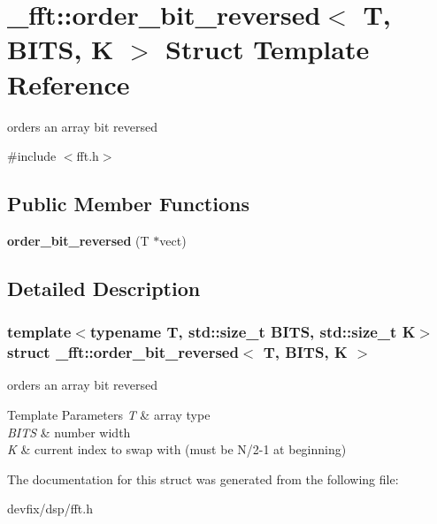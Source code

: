 \hypertarget{struct__fft_1_1order__bit__reversed}{}\section{\+\_\+fft\+:\+:order\+\_\+bit\+\_\+reversed$<$ T, B\+I\+TS, K $>$ Struct Template Reference}
\label{struct__fft_1_1order__bit__reversed}


orders an array bit reversed  




{\ttfamily \#include $<$fft.\+h$>$}

\subsection*{Public Member Functions}
\begin{DoxyCompactItemize}
\item 
\mbox{\label{struct__fft_1_1order__bit__reversed_aa31dcc8bd387dda7fa2f5b4a18b60730}} 
{\bfseries order\+\_\+bit\+\_\+reversed} (T $\ast$vect)
\end{DoxyCompactItemize}


\subsection{Detailed Description}
\subsubsection*{template$<$typename T, std\+::size\+\_\+t B\+I\+TS, std\+::size\+\_\+t K$>$\newline
struct \+\_\+fft\+::order\+\_\+bit\+\_\+reversed$<$ T, B\+I\+T\+S, K $>$}

orders an array bit reversed 


\begin{DoxyTemplParams}{Template Parameters}
{\em T} & array type \\
\hline
{\em B\+I\+TS} & number width \\
\hline
{\em K} & current index to swap with (must be N/2-\/1 at beginning) \\
\hline
\end{DoxyTemplParams}


The documentation for this struct was generated from the following file\+:\begin{DoxyCompactItemize}
\item 
devfix/dsp/fft.\+h\end{DoxyCompactItemize}

